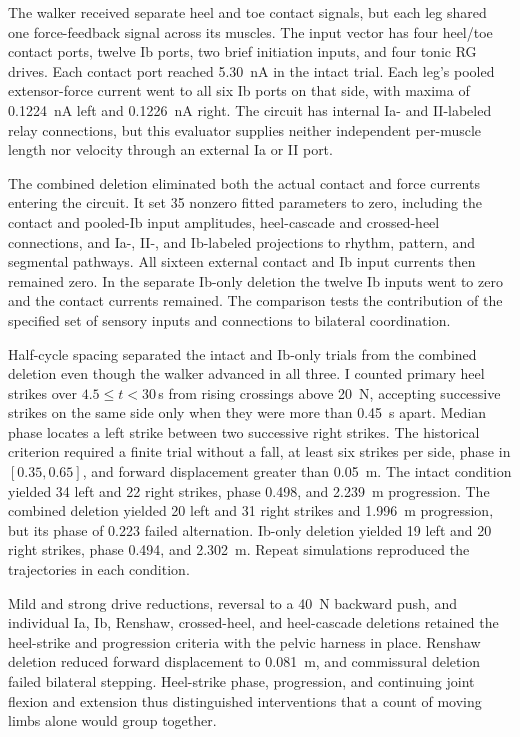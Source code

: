 The walker received separate heel and toe contact signals, but each leg shared one force-feedback signal across its muscles. The input vector has four heel/toe contact ports, twelve Ib ports, two brief initiation inputs, and four tonic RG drives. Each contact port reached \qty{5.30}{\nano\ampere} in the intact trial. Each leg's pooled extensor-force current went to all six Ib ports on that side, with maxima of \qty{0.1224}{\nano\ampere} left and \qty{0.1226}{\nano\ampere} right. The circuit has internal Ia- and II-labeled relay connections, but this evaluator supplies neither independent per-muscle length nor velocity through an external Ia or II port.

The combined deletion eliminated both the actual contact and force currents entering the circuit. It set 35 nonzero fitted parameters to zero, including the contact and pooled-Ib input amplitudes, heel-cascade and crossed-heel connections, and Ia-, II-, and Ib-labeled projections to rhythm, pattern, and segmental pathways. All sixteen external contact and Ib input currents then remained zero. In the separate Ib-only deletion the twelve Ib inputs went to zero and the contact currents remained. The comparison tests the contribution of the specified set of sensory inputs and connections to bilateral coordination.

Half-cycle spacing separated the intact and Ib-only trials from the combined deletion even though the walker advanced in all three. I counted primary heel strikes over $4.5\leq t<30$\,s from rising crossings above \qty{20}{\newton}, accepting successive strikes on the same side only when they were more than \qty{0.45}{\second} apart. Median phase locates a left strike between two successive right strikes. The historical criterion required a finite trial without a fall, at least six strikes per side, phase in $[0.35,0.65]$, and forward displacement greater than \qty{0.05}{\meter}. The intact condition yielded 34 left and 22 right strikes, phase 0.498, and \qty{2.239}{\meter} progression. The combined deletion yielded 20 left and 31 right strikes and \qty{1.996}{\meter} progression, but its phase of 0.223 failed alternation. Ib-only deletion yielded 19 left and 20 right strikes, phase 0.494, and \qty{2.302}{\meter}. Repeat simulations reproduced the trajectories in each condition.

Mild and strong drive reductions, reversal to a \qty{40}{\newton} backward push, and individual Ia, Ib, Renshaw, crossed-heel, and heel-cascade deletions retained the heel-strike and progression criteria with the pelvic harness in place. Renshaw deletion reduced forward displacement to \qty{0.081}{\meter}, and commissural deletion failed bilateral stepping. Heel-strike phase, progression, and continuing joint flexion and extension thus distinguished interventions that a count of moving limbs alone would group together.

